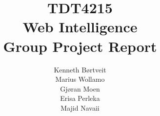 \documentclass[a4paper, 11pt]{article}
\title{TDT4215 \\ Web Intelligence \\ Group Project Report}
\author{Kenneth Børtveit \\ Marius Wollamo \\ Gjøran Moen \\ Erisa Perleka \\ Majid Navaii}
\begin{document}
\maketitle
\pagebreak
\end{document}
